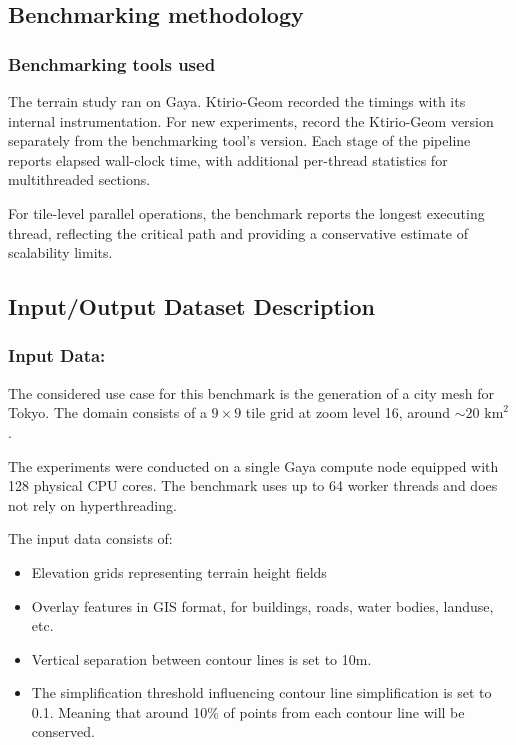\subsection{Benchmarking methodology}
\subsubsection{Benchmarking tools used}

The terrain study ran on Gaya. Ktirio-Geom recorded the timings with its
internal instrumentation. For new experiments, record the Ktirio-Geom
version separately from the benchmarking tool's version.
Each stage of the pipeline reports elapsed wall-clock time, with additional per-thread statistics for multithreaded sections.

For tile-level parallel operations, the benchmark reports the longest executing thread, reflecting the critical path and providing a conservative estimate of scalability limits.


\subsection{Input/Output Dataset Description}


\subsubsection{Input Data:}

The considered use case for this benchmark is the generation of a city mesh for Tokyo.
The domain consists of a $9 \times 9$ tile grid at zoom level 16, around $\sim 20 \text{ km}^2$.

The experiments were conducted on a single Gaya compute node equipped with 128 physical CPU cores. The benchmark uses up to 64 worker threads and does not rely on hyperthreading.

The input data consists of:

\begin{itemize}
    \item Elevation grids representing terrain height fields
    \item Overlay features in GIS format, for buildings, roads, water bodies, landuse, etc.
    \item Vertical separation between contour lines is set to 10m.
    \item The simplification threshold influencing contour line simplification is set to 0.1. Meaning that around 10\% of points from each contour line will be conserved.
\end{itemize}

